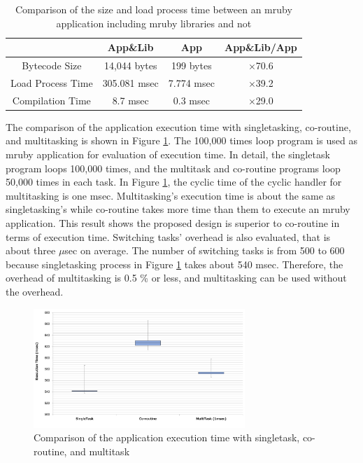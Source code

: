 \documentclass[conference,compsoc]{IEEEtran}
\begin{document}
\begin{table}[t]
    \centering
    \caption{Comparison of the size and load process time between an mruby application including mruby libraries and not}
    \begin{tabular}{c||c|c|c}
                            & App\&Lib     & App        &   App\&Lib/App  \\ \hline
          Bytecode Size     & 14,044 bytes & 199 bytes  &   $\times$70.6          \\ %
          Load Process Time & 305.081 msec & 7.774 msec &   $\times$39.2          \\
          Compilation Time  & 8.7 msec     & 0.3 msec   &   $\times$29.0          \\
    \end{tabular}
    \label{tab:size_and_time}
\end{table}

The comparison of the application execution time with singletasking, co-routine, and multitasking is shown in Figure \ref{fig:comparison_s_c_m}.
The 100,000 times loop program is used as mruby application for evaluation of execution time.
In detail, the singletask program loops 100,000 times, and the multitask and co-routine programs loop 50,000 times in each task.
In Figure \ref{fig:comparison_s_c_m}, the cyclic time of the cyclic handler for multitasking is one msec.
Multitasking's execution time is about the same as singletasking's while co-routine takes more time than them to execute an mruby application.
This result shows the proposed design is superior to co-routine in terms of execution time.
Switching tasks' overhead is also evaluated, that is about three $\mu$sec on average.
The number of switching tasks is from 500 to 600 because singletasking process in Figure \ref{fig:comparison_s_c_m} takes about 540 msec.
Therefore, the overhead of multitasking is 0.5 \% or less, and multitasking can be used without the overhead.

\begin{figure}[t]
    \centering
    \includegraphics[width=8cm,clip]{figure/comparison_s_c_m.pdf}
    \caption{Comparison of the application execution time with singletask, co-routine, and multitask}
    \label{fig:comparison_s_c_m}
\end{figure}
\end{document}
